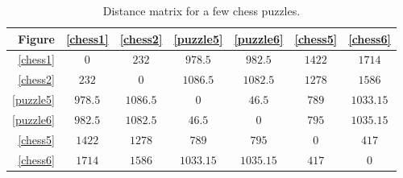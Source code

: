 \begin{table}[H]
  \centering
  \begin{tabular}{r|cccccc}
    Figure & \ref{chess1}&\ref{chess2}&\ref{puzzle5}&\ref{puzzle6}&\ref{chess5}&\ref{chess6} \\
    \hline
    \ref{chess1} & $0$ & $232$ & $978.5$ & $982.5$ & $1422$ & $1714$ \\ 
    \ref{chess2} & $232$ & $0$ & $1086.5$ & $1082.5$ & $1278$ & $1586$ \\
    \ref{puzzle5} & $978.5$ & $1086.5$ & $0$ & $46.5$ & $789$ & $1033.15$ \\
    \ref{puzzle6} & $982.5$ & $1082.5$ & $46.5$ & $0$ & $795$ & $1035.15$ \\
    \ref{chess5} & $1422$ & $1278$ & $789$ & $795$ & $0$ & $417$ \\
    \ref{chess6} & $1714$ & $1586$ & $1033.15$ & $1035.15$ & $417$ & $0$ \\
  \end{tabular}
  \caption{Distance matrix for a few chess puzzles.}
  \label{distanceComparisons}
\end{table}



